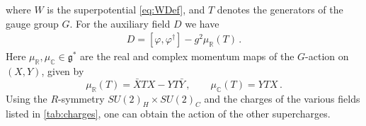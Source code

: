 \documentclass[12pt,a4paper]{article}
\renewcommand{\(}{\left(}
\renewcommand{\)}{\right)}
\renewcommand{\(}{\left(}
\renewcommand{\)}{\right)}
\begin{document}
where $W$ is the superpotential \eqref{eq:WDef}, and $T$ denotes the generators of the gauge group $G$. 
For the auxiliary field $D$ we have
\begin{equation}
\begin{aligned}
D=[\varphi,\varphi^\dag]-g^2\mu_{\mathbb{R}}(T)\,.
\end{aligned}
\end{equation}
Here $\mu_{\mathbb{R}},\mu_{\mathbb{C}}\in \mathfrak{g}^*$ are the real and complex momentum maps of the $G$-action on $(X,Y)$, given by
\begin{equation}
\mu_{\mathbb{R}}(T)=\bar{X}TX-YT\bar{Y}\,,\qquad \mu_{\mathbb{C}}(T)= YT X\,.
\end{equation}
Using the $R$-symmetry $SU(2)_H\times SU(2)_C$ and the charges of the various fields listed in \eqref{tab:charges}, one can obtain the action of the other supercharges. 
	
\medskip
	
\end{document}
